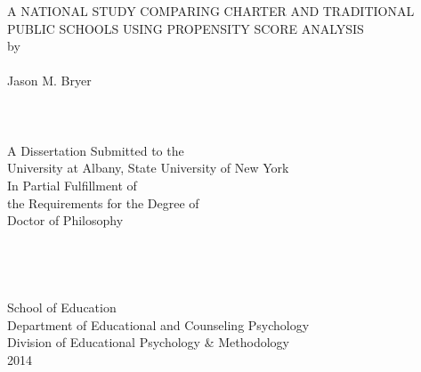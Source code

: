 \documentclass[letterpaper,12p,twoside]{article} %
\begin{document}
\begin{titlepage}
\vspace*{\fill}
\begin{center}
A NATIONAL STUDY COMPARING CHARTER AND TRADITIONAL PUBLIC SCHOOLS USING PROPENSITY SCORE ANALYSIS\ \\
by
\ \\ \ \\
Jason M. Bryer\\
\ \\ \ \\ \ \\
A Dissertation Submitted to the\\
University at Albany, State University of New York\\
In Partial Fulfillment of\\
the Requirements for the Degree of\\
Doctor of Philosophy\\
\ \\ \ \\ \ \\ \ \\
School of Education\\
Department of Educational and Counseling Psychology\\
Division of Educational Psychology \& Methodology\\
2014
\end{center}
\vspace*{\fill}
\end{titlepage}
\setcounter{page}{2}
\newpage


\ \\
\cleardoublepage
\end{document}
